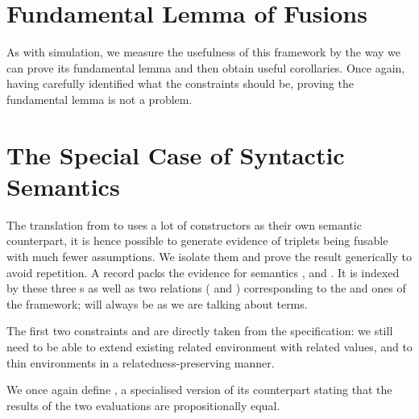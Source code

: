 
\section{Fundamental Lemma of Fusions}

As with simulation, we measure the usefulness of this framework by the way we can
prove its fundamental lemma and then obtain useful corollaries. Once again,
having carefully identified what the constraints should be, proving the fundamental
lemma is not a problem.


\section{The Special Case of Syntactic Semantics}

The translation from  to  uses a lot of constructors
as their own semantic counterpart, it is hence possible to generate evidence of
 triplets being fusable with much fewer assumptions. We isolate
them and prove the result generically to avoid repetition. A 
record packs the evidence for  semantics ,  and
. It is indexed by these three s as well as two relations
( and ) corresponding to the  and  ones of the
 framework;  will always be  as we are talking about terms.


The first two constraints  and  are directly taken
from the  specification: we still need to be able to extend existing related
environment with related values, and to thin environments in a relatedness-preserving manner.


We once again define , a specialised version of its  counterpart
stating that the results of the two evaluations are propositionally equal.


